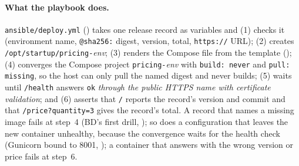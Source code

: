 \paragraph{What the playbook does.} \texttt{ansible/deploy.yml} () takes one release record as variables and (1) checks it (environment name, \texttt{@sha256:} digest, version, total, \texttt{https://} URL);
(2) creates \texttt{/opt/startup/pricing-}\emph{env}; (3) renders the Compose file from the template (); (4) converges the Compose project \texttt{pricing-}\emph{env} with \texttt{build: never} and \texttt{pull: missing}, so the host can only
pull the named digest and never builds; (5) waits until \texttt{/health} answers \texttt{ok} \emph{through the public HTTPS name with certificate validation}; and (6) asserts that \texttt{/} reports the record's version and commit and that \texttt{/price?quantity=3}
gives the record's total. A record that names a missing image fails at step~4 (BD's first drill, ); so does a configuration that leaves the new container unhealthy, because the convergence waits for the health check (Gunicorn bound to 8001, ); a container that answers with the wrong version or price fails at step~6.

